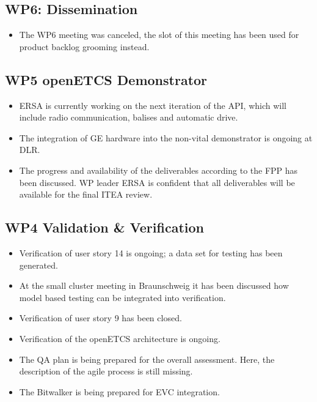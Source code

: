 \documentclass[a4paper, 11pt]{article}
\begin{document}
\subsection{WP6: Dissemination}
\begin{itemize}
\item The WP6 meeting was canceled, the slot of this meeting has been used for product backlog grooming instead.
\end{itemize}

\subsection{WP5 openETCS Demonstrator}
\begin{itemize}
\item ERSA is currently working on the next iteration of the API, which will include radio communication, balises and automatic drive.
\item The integration of GE hardware into the non-vital demonstrator is ongoing at DLR.
\item The progress and availability of the deliverables according to the FPP has been discussed. WP leader ERSA is confident that all deliverables will be available for the final ITEA review.
\end{itemize}

\subsection{WP4 Validation \& Verification}
\begin{itemize}
\item Verification of user story 14 is ongoing; a data set for testing has been generated.
\item At the small cluster meeting in Braunschweig it has been discussed how model based testing can be integrated into verification.
\item Verification of user story 9 has been closed.
\item Verification of the openETCS architecture is ongoing.
\item The QA plan is being prepared for the overall assessment. Here, the description of the agile process is still missing.
\item The Bitwalker is being prepared for EVC integration.
\end{itemize}
\end{document}
